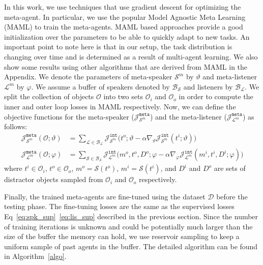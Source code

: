 \documentclass{article}
\begin{document}
In this work, we use techniques that use gradient descent for optimizing the meta-agent. In particular, we use the popular Model Agnostic Meta Learning (MAML) \citep{finn_model-agnostic_2017} to train the meta-agents. MAML based approaches provide a good initialization over the parameters to be able to quickly adapt to new tasks. An important point to note here is that in our setup, the task distribution is changing over time and is determined as a result of multi-agent learning. We also show some results using other algorithms that are derived from MAML in the Appendix. We denote the parameters of meta-speaker $\mathcal{S}^m$ by $\vartheta$ and meta-listener $\mathcal{L}^m$ by $\varphi$. We assume a buffer of speakers denoted by $\mathcal{B}_\mathcal{S}$ and listeners by $\mathcal{B}_\mathcal{L}$. 
We split the collection of objects $\mathcal{O}$ into two sets $\mathcal{O}_i$ and $\mathcal{O}_o$ in order to compute the inner and outer loop losses in MAML respectively. Now, we can define the objective functions for the meta-speaker ($\mathcal{J}_{\mathcal{S}^m}^\texttt{meta}$) and the meta-listener ($\mathcal{J}_{\mathcal{L}^m}^\texttt{meta}$) as follows:
\begin{align}
\mathcal{J}_{\mathcal{S}^m}^\texttt{meta}(\mathcal{O};\vartheta) &= \sum_{\mathcal{L} \in \mathcal{B}_\mathcal{L}} \mathcal{J}_{\mathcal{S}^m}^\texttt{int} \Big( t^o; \vartheta - \alpha \nabla_\vartheta \mathcal{J}^\texttt{int}_{\mathcal{S}^m} \left( t^i;\vartheta \right) \Big) \label{eq:meta_spk} \\
\mathcal{J}_{\mathcal{L}^m}^\texttt{meta}(\mathcal{O};\varphi) &= \sum_{\mathcal{S} \in \mathcal{B}_\mathcal{S}} \mathcal{J}_{\mathcal{L}^m}^\texttt{int} \Big( m^o, t^o, D^o; \varphi - \alpha \nabla_\varphi \mathcal{J}^\texttt{int}_{\mathcal{L}^m} \left( m^i, t^i, D^i;\varphi \right) \Big) \label{eq:meta_lis}
\end{align}
where $t^i \in \mathcal{O}_i$, $t^o \in \mathcal{O}_o$, $m^o = \mathcal{S}(t^o)$, $m^i = \mathcal{S}(t^i)$, and $D^i$ and $D^o$ are sets of distractor objects sampled from $\mathcal{O}_i$ and $\mathcal{O}_o$ respectively.

Finally, the trained meta-agents are fine-tuned using the dataset $\mathcal{D}$ before the testing phase. The fine-tuning losses are the same as the supervised losses Eq~\eqref{eq:spk_sup}~\eqref{eq:lis_sup} described in the previous section. Since the number of training iterations is unknown and could be potentially much larger than the size of the buffer the memory can hold, we use reservoir sampling to keep a uniform sample of past agents in the buffer. The detailed algorithm can be found in Algorithm~\ref{algo}.
\end{document}
